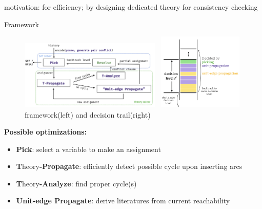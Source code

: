 
\begin{frame}
	motivation: for efficiency; by designing dedicated theory for consistency checking
\end{frame}

\begin{frame}{Framework}

	\begin{figure}[H]
		\centering
		\includegraphics[width=0.6\textwidth]{figs/acyclic-minisat-framework.png}~
		\includegraphics[width=0.36\textwidth]{figs/acyclic-minisat-decision-trail.png}
		\vspace*{0.30cm}
		\footnotesize{framework(left) and decision trail(right)}
	\end{figure}

	\footnotesize{\textcolor[RGB]{71,46,125}{\textbf{Possible optimizations:}}}
	\scriptsize{
		\begin{itemize}
			\item \textcolor[RGB]{71,46,125}{\textbf{Pick}}: select a variable to make an assignment
			\item \textcolor[RGB]{71,46,125}{\textbf{T}}heory\textcolor[RGB]{71,46,125}{\textbf{-Propagate}}: efficiently detect possible cycle upon inserting arcs
			\item \textcolor[RGB]{71,46,125}{\textbf{T}}heory\textcolor[RGB]{71,46,125}{\textbf{-Analyze}}: find proper cycle(s)
			\item \textcolor[RGB]{71,46,125}{\textbf{Unit-edge Propagate}}: derive literatures from current reachability
		\end{itemize}
	}
\end{frame}

